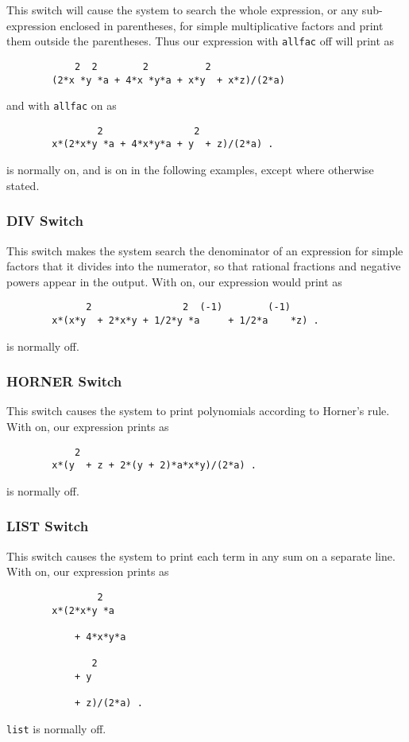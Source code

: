 This switch will cause the system to search the whole expression, or any
sub-expression enclosed in parentheses, for simple multiplicative factors
and print them outside the parentheses. Thus our expression with \texttt{allfac}
off will print as
\begin{verbatim}
            2  2        2          2
        (2*x *y *a + 4*x *y*a + x*y  + x*z)/(2*a)
\end{verbatim}
and with \texttt{allfac} on as
\begin{verbatim}
                2                2
        x*(2*x*y *a + 4*x*y*a + y  + z)/(2*a) .
\end{verbatim}
 is normally on, and is on in the following examples, except
where otherwise stated.

\subsubsection{DIV Switch}
\hypertarget{switch:DIV}{}

This switch makes the system search the denominator of an expression for
simple factors that it divides into the numerator, so that rational
fractions and negative powers appear in the output. With  on, our
expression would print as
\begin{verbatim}
              2                2  (-1)        (-1)
        x*(x*y  + 2*x*y + 1/2*y *a     + 1/2*a    *z) .
\end{verbatim}
 is normally off.

\subsubsection{HORNER Switch}
\hypertarget{switch:HORNER}{}

This switch causes the system to print polynomials according to Horner's rule.
With  on, our expression prints as
\begin{verbatim}
            2
        x*(y  + z + 2*(y + 2)*a*x*y)/(2*a) .
\end{verbatim}
 is normally off.

\subsubsection{LIST Switch}
\hypertarget{switch:LIST}{}

This switch causes the system to print each term in any sum on a separate
line. With  on, our expression prints as
\begin{verbatim}
                2
        x*(2*x*y *a

            + 4*x*y*a

               2
            + y

            + z)/(2*a) .
\end{verbatim}
\texttt{list} is normally off.

